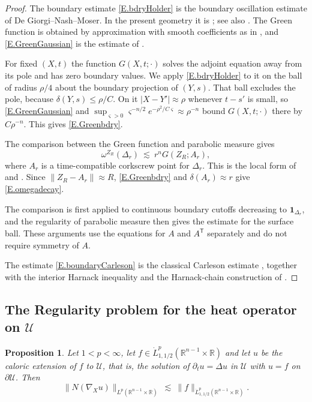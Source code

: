 \documentclass[10pt,a4paper]{amsart}
\numberwithin{equation}{section}
\newcommand{\R}{\mathbb R}
\newcommand{\pd}{\partial}
\newcommand{\Uc}{\mathcal U}
\newtheorem{proposition}[equation]{Proposition}
\begin{document}
\begin{proof}
The boundary estimate \eqref{E.bdryHolder} is the boundary oscillation estimate
of De Giorgi--Nash--Moser. In the present geometry it is
\cite[Chapter I, Lemma 3.9]{HLmem}; see also \cite[\S2]{N}. The Green function
is obtained by approximation with smooth coefficients as in
\cite[Chapter I, \S3]{HLmem}, and \eqref{E.GreenGaussian} is the estimate of
\cite{Ar}.

For fixed $(X,t)$ the function $G(X,t;\cdot)$ solves the adjoint equation away
from its pole and has zero boundary values.  We apply \eqref{E.bdryHolder} to
it on the ball of radius $\rho/4$ about the boundary projection of $(Y,s)$.
That ball excludes the pole, because $\delta(Y,s)\le\rho/C$.  On it
$|X-Y'|\approx\rho$ whenever $t-s'$ is small, so \eqref{E.GreenGaussian} and
$\sup_{\varsigma>0}\varsigma^{-n/2}e^{-\rho^2/C\varsigma}\approx\rho^{-n}$
bound $G(X,t;\cdot)$ there by $C\rho^{-n}$.  This gives \eqref{E.Greenbdry}.

The comparison between the Green function and parabolic measure gives
\[
 \omega^{Z_R}(\Delta_r)\ \lesssim\ r^nG(Z_R;A_r),
\]
where $A_r$ is a time-compatible corkscrew point for $\Delta_r$.  This is the
local form of \cite[Chapter I, Lemma 3.10]{HLmem} and
\cite[\S\S3--4]{N}.  Since $\|Z_R-A_r\|\approx R$,
\eqref{E.Greenbdry} and $\delta(A_r)\approx r$ give
\eqref{E.omegadecay}.

The comparison is first applied to continuous boundary cutoffs decreasing to
$\mathbf1_{\Delta_r}$, and the regularity of parabolic measure then gives the
estimate for the surface ball.  These arguments use the equations for $A$ and
$A^{\mathsf T}$ separately and do not require symmetry of $A$.

The estimate \eqref{E.boundaryCarleson} is the classical Carleson estimate
\cite[Lemma 2.5]{N}, together with the interior Harnack inequality and the
Harnack-chain construction of \cite[\S2]{N}.
\end{proof}

\subsection{The Regularity problem for the heat operator on $\Uc$}
\label{ss.flat}

\begin{proposition}\label{P.flat}
Let $1<p<\infty$, let $f\in\dot L^p_{1,1/2}(\R^{n-1}\times\R)$ and let $u$ be
the caloric extension of $f$ to $\Uc$, that is, the solution of $\pd_tu=\Delta u$
in $\Uc$ with $u=f$ on $\pd\Uc$. Then
\begin{equation}\label{E.flat}
  \big\|N(\nabla_Xu)\big\|_{L^p(\R^{n-1}\times\R)}\ \lesssim\
  \|f\|_{\dot L^p_{1,1/2}(\R^{n-1}\times\R)} .
\end{equation}
\end{proposition}
\end{document}
